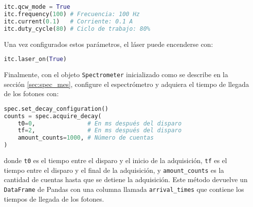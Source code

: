\begin{lstlisting}[language=Python]
itc.qcw_mode = True
itc.frequency(100) # Frecuencia: 100 Hz
itc.current(0.1)   # Corriente: 0.1 A
itc.duty_cycle(80) # Ciclo de trabajo: 80%
\end{lstlisting}

Una vez configurados estos parámetros, el láser puede encenderse con:

\begin{lstlisting}[language=Python]
itc.laser_on(True)
\end{lstlisting}

\noindent Finalmente, con el objeto \texttt{Spectrometer} inicializado como se describe en la sección \ref{sec:spec_mes}, configure el espectrómetro y adquiera el tiempo de llegada de los fotones con:

\begin{lstlisting}[language=Python]
spec.set_decay_configuration()
counts = spec.acquire_decay(
    t0=0,               # En ms después del disparo
    tf=2,               # En ms después del disparo
    amount_counts=1000, # Número de cuentas
)
\end{lstlisting}

\noindent donde \texttt{t0} es el tiempo entre el disparo y el inicio de la adquisición, \texttt{tf} es el tiempo entre el disparo y el final de la adquisición, y \texttt{amount\_counts} es la cantidad de cuentas hasta que se detiene la adquisición. Este método devuelve un \texttt{DataFrame} de Pandas con una columna llamada \texttt{arrival\_times} que contiene los tiempos de llegada de los fotones.


